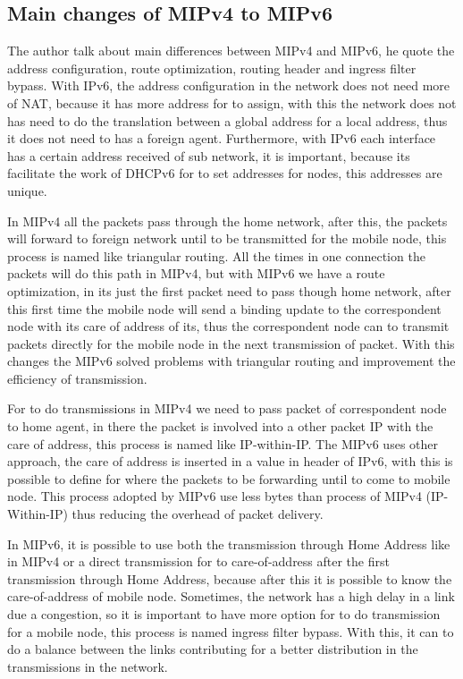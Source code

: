 \documentclass[12pt]{article}
\begin{document}
\subsection{Main changes of MIPv4 to MIPv6}
The author talk about main differences between MIPv4 and MIPv6, he quote the address configuration, route optimization, routing header and ingress filter bypass. With IPv6, the address configuration in the network does not need more of NAT, because it has more address for to assign, with this the network does not has need to do the translation between a global address for a local address, thus it does not need to has a foreign agent. Furthermore, with IPv6 each interface has a certain address received of sub network, it is important, because its facilitate the work of DHCPv6 for to set addresses for nodes, this addresses are unique.

In MIPv4 all the packets pass through the home network, after this, the packets will forward to foreign network until to be transmitted for the mobile node, this process is named like triangular routing. All the times in one connection the packets will do this path in MIPv4, but with MIPv6 we have a route optimization, in its just the first packet need to pass though home network, after this first time the mobile node will send a binding update to the correspondent node with its care of address of its, thus the correspondent node can to transmit packets directly for the mobile node in the next transmission of packet. With this changes the MIPv6 solved problems with triangular routing and improvement the efficiency of transmission.

For to do transmissions in MIPv4 we need to pass packet of correspondent node to home agent, in there the packet is involved into a other packet IP with the care of address, this process is named like IP-within-IP. The MIPv6 uses other approach, the care of address is inserted in a value in header of IPv6, with this is possible to define for where the packets to be forwarding until to come to mobile node. This process adopted by MIPv6 use less bytes than process of MIPv4 (IP-Within-IP) thus reducing the overhead of packet delivery.

In MIPv6, it is possible to use both the transmission through Home Address like in MIPv4 or a direct transmission for to care-of-address after the first transmission through Home Address, because after this it is possible to know the care-of-address of mobile node. Sometimes, the network has a high delay in a link due a congestion, so it is important to have more option for to do transmission for a mobile node, this process is named ingress filter bypass. With this, it can to do a balance between the links contributing for a better distribution in the transmissions in the network.
\end{document}
